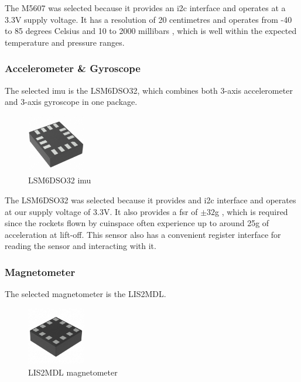 The M5607 was selected because it provides an \gls{i2c} interface and operates at a 3.3V supply voltage.
\cite[1]{ms5607-datasheet} It has a resolution of 20 centimetres \cite[1]{ms5607-datasheet} and operates from -40 to 85
degrees Celsius and 10 to 2000 millibars \cite[1]{ms5607-datasheet}, which is well within the expected temperature and
pressure ranges.

\subsubsection{Accelerometer \& Gyroscope}

The selected \gls{imu} is the LSM6DSO32, which combines both 3-axis accelerometer and 3-axis gyroscope in one package.

\begin{figure}[H]
    \centering
    \includegraphics[width=1in]{assets/images/lsm6dso32.jpg}
    \caption{LSM6DSO32 \gls{imu} \cite{lsm6dso32-pic}}
\end{figure}

The LSM6DSO32 was selected because it provides and \gls{i2c} interface and operates at our supply voltage of 3.3V.
\cite{lsm6dso32-datasheet} It also provides a \gls{fsr} of $\pm 32$g \cite[1]{lsm6dso32-datasheet}, which is required
since the rockets flown by \gls{cuinspace} often experience up to around 25g of acceleration at lift-off. This sensor
also has a convenient register interface for reading the sensor and interacting with it.

\subsubsection{Magnetometer}

The selected magnetometer is the LIS2MDL.

\begin{figure}[H]
    \centering
    \includegraphics[width=1in]{assets/images/lis2mdl.jpg}
    \caption{LIS2MDL magnetometer \cite{lis2dml-pic}}
    \label{fig:magnetometer}
\end{figure}

